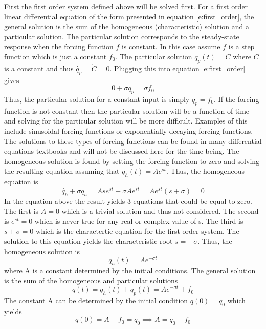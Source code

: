 First the first order system defined above will be solved first. For a first order linear differential equation of the form presented in equation \ref{e:first_order}, the general solution is the sum of the homogeneous (characteristic) solution and a particular solution. The particular solution corresponds to the steady-state response when the forcing function $f$ is constant. In this case assume $f$ is a step function which is just a constant $f_0$. The particular solution $q_p(t)=C$ where $C$ is a constant and thus $\dot{q_p}=\dot{C}=0.$ Plugging this into equation \ref{e:first_order} gives
\begin{equation}
    0 + \sigma q_p = \sigma f_0 
\end{equation}
Thus, the particular solution for a constant input is simply $q_p = f_0$. If the forcing function is not constant then the particular solution will be a function of time and solving for the particular solution will be more difficult. Examples of this include sinusoidal forcing functions or exponentially decaying forcing functions. The solutions to these types of forcing functions can be found in many differential equations textbooks and will not be discussed here for the time being. The homogeneous solution is found by setting the forcing function to zero and solving the resulting equation assuming that $q_h(t)=Ae^{st}$. Thus, the homogeneous equation is
\begin{equation}
    \dot{q_h} + \sigma q_h = Ase^{st} + \sigma Ae^{st} = Ae^{st}(s+\sigma) = 0
\end{equation}
In the equation above the result yields 3 equations that could be equal to zero. The first is $A=0$ which is a trivial solution and thus not considered. The second is $e^{st}=0$ which is never true for any real or complex value of s. The third is $s+\sigma=0$ which is the charactertic equation for the first order system. The solution to this equation yields the characteristic root $s=-\sigma$. Thus, the homogeneous solution is
\begin{equation}
    q_h(t) = Ae^{-\sigma t}
\end{equation}
where A is a constant determined by the initial conditions. The general solution is the sum of the homogeneous and particular solutions
\begin{equation}
    q(t) = q_h(t) + q_p(t) = Ae^{-\sigma t} + f_0
\end{equation}
The constant A can be determined by the initial condition $q(0)=q_0$ which yields
\begin{equation}
    q(0) = A + f_0 = q_0 \implies A = q_0 - f_0
\end{equation}
